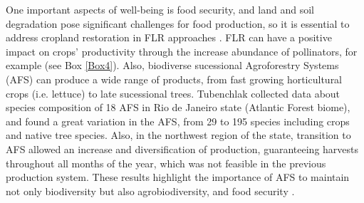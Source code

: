 One important aspects of well-being is food security, and land and soil degradation pose significant challenges for food production, so it is essential to address cropland restoration in FLR approaches \citep{Pinto2014a}. FLR can have a positive impact on crops' productivity through the increase abundance of pollinators, for example (see Box \ref{Box4}). Also, biodiverse sucessional Agroforestry Systems (AFS) can produce a wide range of products, from fast growing horticultural crops (i.e. lettuce) to late sucessional trees. Tubenchlak \cite{Tubenchlak2017} collected data about species composition of 18 AFS in Rio de Janeiro state (Atlantic Forest biome), and found a great variation in the AFS, from 29 to 195 species including crops and native tree species. Also, in the northwest region of the state, transition to AFS allowed an increase and diversification of production, guaranteeing harvests throughout all months of the year, which was not feasible in the previous production system. These results highlight the importance of AFS to maintain not only biodiversity but also agrobiodiversity, and food security \cite{Tubenchlak2017}.





\addtocounter{mybox}{-1}

